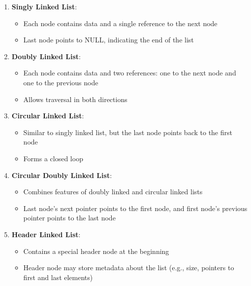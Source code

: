 \begin{enumerate}
\def\labelenumi{\arabic{enumi}.}
\tightlist
\item
  \textbf{Singly Linked List}:

  \begin{itemize}
  \tightlist
  \item
    Each node contains data and a single reference to the next node
  \item
    Last node points to NULL, indicating the end of the list
  \end{itemize}
\item
  \textbf{Doubly Linked List}:

  \begin{itemize}
  \tightlist
  \item
    Each node contains data and two references: one to the next node and
    one to the previous node
  \item
    Allows traversal in both directions
  \end{itemize}
\item
  \textbf{Circular Linked List}:

  \begin{itemize}
  \tightlist
  \item
    Similar to singly linked list, but the last node points back to the
    first node
  \item
    Forms a closed loop
  \end{itemize}
\item
  \textbf{Circular Doubly Linked List}:

  \begin{itemize}
  \tightlist
  \item
    Combines features of doubly linked and circular linked lists
  \item
    Last node's next pointer points to the first node, and first node's
    previous pointer points to the last node
  \end{itemize}
\item
  \textbf{Header Linked List}:

  \begin{itemize}
  \tightlist
  \item
    Contains a special header node at the beginning
  \item
    Header node may store metadata about the list (e.g., size, pointers
    to first and last elements)
  \end{itemize}
\end{enumerate}

